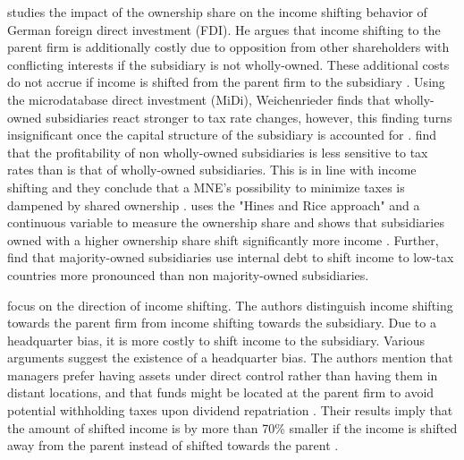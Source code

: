 \documentclass[10pt,twocolumn,oneside,cmyk]{article}
\begin{document}
\textcite{weichenrieder_profit_2009} studies the impact of the ownership share on the income shifting behavior of German foreign direct investment (FDI). He argues that income shifting to the parent firm is additionally costly due to opposition from other shareholders with conflicting interests if the subsidiary is not wholly-owned. These additional costs do not accrue if income is shifted from the parent firm to the subsidiary \parencite[285]{weichenrieder_profit_2009}. Using the microdatabase direct investment (MiDi), Weichenrieder finds that wholly-owned subsidiaries react stronger to tax rate changes, however, this finding turns insignificant once the capital structure of the subsidiary is accounted for \parencite[295]{weichenrieder_profit_2009}. \textcite[341-343]{desai_costs_2004} find that the profitability of non wholly-owned subsidiaries is less sensitive to tax rates than is that of wholly-owned subsidiaries. This is in line with income shifting and they conclude that a MNE's possibility to minimize taxes is dampened by shared ownership \parencite[341]{desai_costs_2004}. \textcite{dischinger_profit_2008} uses the "Hines and Rice approach" and a continuous variable to measure the ownership share and shows that subsidiaries owned with a higher ownership share shift significantly more income \parencite[17-18]{dischinger_profit_2008}. Further, \textcite[84]{buettner_internal_2013} find that majority-owned subsidiaries use internal debt to shift income to low-tax countries more pronounced than non majority-owned subsidiaries.

\textcite{dischinger_role_2014} focus on the direction of income shifting. The authors distinguish income shifting towards the parent firm from income shifting towards the subsidiary. Due to a headquarter bias, it is more costly to shift income to the subsidiary. Various arguments suggest the existence of a headquarter bias. The authors mention that managers prefer having assets under direct control rather than having them in distant locations, and that funds might be located at the parent firm to avoid potential withholding taxes upon dividend repatriation \parencite[249]{dischinger_role_2014}. Their results imply that the amount of shifted income is by more than 70\% smaller if the income is shifted away from the parent instead of shifted towards the parent \parencite[268]{dischinger_role_2014}.
\end{document}
